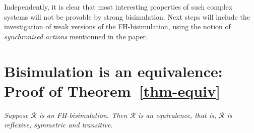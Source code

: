 \documentclass{lncs/llncs}
\begin{document}
Independently, it is clear that most interesting properties of
such complex systems will not be provable by strong bisimulation.
Next steps will include the investigation of weak
versions of the FH-bisimulation, using the notion of
\emph{synchronised actions} mentionned in the paper.



% 


\newpage
\appendix    

       \section{Bisimulation is an equivalence: Proof of Theorem~\ref{thm-equiv}}\label{thm-equiv-proof}
        \emph{Suppose $\mathcal{R}$ 
       	is an FH-bisimulation. Then $\mathcal{R}$ is an equivalence, that is, 
       	$\mathcal{R}$ is 
       	reflexive, symmetric and transitive.
       	}
       
\end{document}
